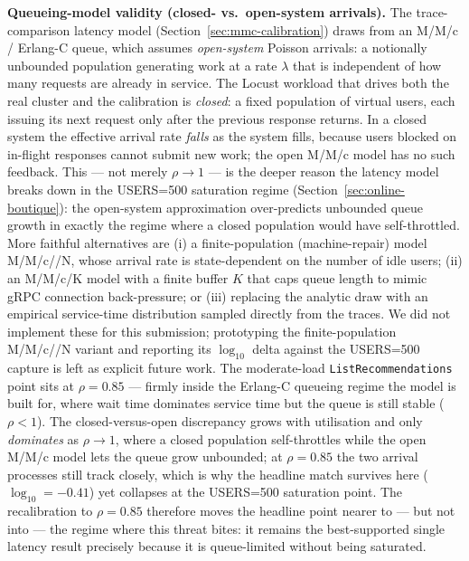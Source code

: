 \documentclass[ASNA,twocolumn]{USG}
\begin{document}
    \textbf{Queueing-model validity (closed- vs.\ open-system arrivals).}
    The trace-comparison latency model (Section~\ref{sec:mmc-calibration})
    draws from an M/M/c / Erlang-C queue, which assumes \emph{open-system}
    Poisson arrivals: a notionally unbounded population generating work at
    a rate $\lambda$ that is independent of how many requests are already
    in service. The Locust workload that drives both the real cluster and
    the calibration is \emph{closed}: a fixed population of virtual users,
    each issuing its next request only after the previous response
    returns. In a closed system the effective arrival rate \emph{falls} as
    the system fills, because users blocked on in-flight responses cannot
    submit new work; the open M/M/c model has no such feedback. This ---
    not merely $\rho \to 1$ --- is the deeper reason the latency model
    breaks down in the USERS=500 saturation regime
    (Section~\ref{sec:online-boutique}): the open-system approximation
    over-predicts unbounded queue growth in exactly the regime where a
    closed population would have self-throttled. More faithful
    alternatives are (i) a finite-population (machine-repair) model
    M/M/c//N, whose arrival rate is state-dependent on the number of idle
    users; (ii) an M/M/c/K model with a finite buffer $K$ that caps queue
    length to mimic gRPC connection back-pressure; or (iii) replacing the
    analytic draw with an empirical service-time distribution sampled
    directly from the traces. We did not implement these for this
    submission; prototyping the finite-population M/M/c//N variant and
    reporting its $\log_{10}$ delta against the USERS=500 capture is left
    as explicit future work. The moderate-load
    \texttt{ListRecommendations} point sits at $\rho = 0.85$ --- firmly
    inside the Erlang-C queueing regime the model is built for, where wait
    time dominates service time but the queue is still stable
    ($\rho < 1$). The closed-versus-open discrepancy grows with
    utilisation and only \emph{dominates} as $\rho \to 1$, where a closed
    population self-throttles while the open M/M/c model lets the queue
    grow unbounded; at $\rho = 0.85$ the two arrival processes still track
    closely, which is why the headline match survives here
    ($\log_{10} = -0.41$) yet collapses at the USERS=500 saturation point.
    The recalibration to $\rho = 0.85$ therefore moves the headline point
    nearer to --- but not into --- the regime where this threat bites: it
    remains the best-supported single latency result precisely because it
    is queue-limited without being saturated.
\end{document}
